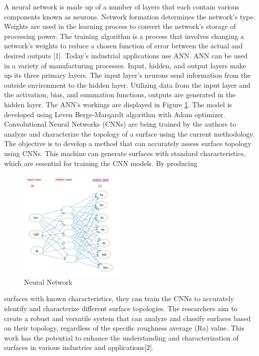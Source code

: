 \documentclass[suppldata]{interact}
\begin{document}
	A neural network is made up of a number of layers that each contain various components known as neurons. Network formation determines the network's type. Weights are used in the learning process to convert the network's storage of processing power. The training algorithm is a process that involves changing a network's weights to reduce a chosen function of error between the actual and desired outputs [1].
	Today's industrial applications use ANN.  ANN can be used in a variety of manufacturing processes. Input, hidden, and output layers make up its three primary layers. The input layer's neurons send information from the outside environment to the hidden layer.  Utilizing data from the input layer and the activation, bias, and summation functions, outputs are generated in the hidden layer. The ANN's workings are displayed in Figure \ref{fig:network}. The model is developed using Leven Berge-Marqardt algorithm with Adam optimizer. Convolutional Neural Networks (CNNs) are being trained by the authors to analyze and characterize the topology of a surface using the current methodology. The objective is to develop a method that can accurately assess surface topology using CNNs. This machine can generate surfaces with standard characteristics, which are essential for training the CNN models. By producing 
 \begin{figure}[htbp]
	\centering
	\includegraphics[width= 0.45\textwidth]{MMP_network.JPG}
	\caption{Neural Network}
   \label{fig:network}
\end{figure}
 surfaces with known characteristics, they can train the CNNs to accurately identify and characterize different surface topologies. The researchers aim to create a robust and versatile system that can analyze and classify surfaces based on their topology, regardless of the specific roughness average (Ra) value. This work has the potential to enhance the understanding and characterization of surfaces in various industries and applications[2]. 
\end{document}
